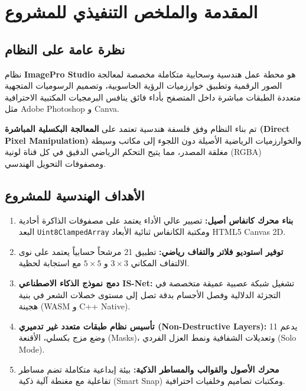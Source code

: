 \documentclass[12pt,a4paper]{report}
\begin{document}
\tableofcontents
\newpage
\listoffigures
\newpage
\listoftables
\newpage

\chapter{المقدمة والملخص التنفيذي للمشروع}

\section{نظرة عامة على النظام}
نظام \textbf{ImagePro Studio} هو محطة عمل هندسية وسحابية متكاملة مخصصة لمعالجة الصور الرقمية وتطبيق خوارزميات الرؤية الحاسوبية، وتصميم الرسوميات المتجهية متعددة الطبقات مباشرة داخل المتصفح بأداء فائق ينافس البرمجيات المكتبية الاحترافية مثل Adobe Photoshop و Canva.

تم بناء النظام وفق فلسفة هندسية تعتمد على \textbf{المعالجة البكسلية المباشرة (Direct Pixel Manipulation)} والخوارزميات الرياضية الأصيلة دون اللجوء إلى مكاتب وسيطة مغلقة المصدر، مما يتيح التحكم الرياضي الدقيق في كل قناة لونية (RGBA) ومصفوفات التحويل الهندسي.

\section{الأهداف الهندسية للمشروع}
\begin{enumerate}
    \item \textbf{بناء محرك كانفاس أصيل:} تصيير عالي الأداء يعتمد على مصفوفات الذاكرة أحادية البعد \texttt{Uint8ClampedArray} ومكتبة الكانفاس ثنائية الأبعاد HTML5 Canvas 2D.
    \item \textbf{توفير استوديو فلاتر والتفاف رياضي:} تطبيق 21 مرشحاً حسابياً يعتمد على نوى الالتفاف المكاني $3 \times 3$ و $5 \times 5$ مع استجابة لحظية.
    \item \textbf{دمج نموذج الذكاء الاصطناعي IS-Net:} تشغيل شبكة عصبية عميقة متخصصة في التجزئة الدلالية وفصل الأجسام بدقة تصل إلى مستوى خصلات الشعر في بنية هجينة (WASM و C++ Native).
    \item \textbf{تأسيس نظام طبقات متعدد غير تدميري (Non-Destructive Layers):} يدعم 11 وضع مزج بكسلي، الأقنعة (Masks)، وتعديلات الشفافية ونمط العزل الفردي (Solo Mode).
    \item \textbf{محرك الأصول والقوالب والمساطر الذكية:} بيئة إبداعية متكاملة تضم مساطر تفاعلية مع مغنطة آلية ذكية (Smart Snap) ومكتبات تصاميم وخلفيات احترافية.
\end{enumerate}
\end{document}
